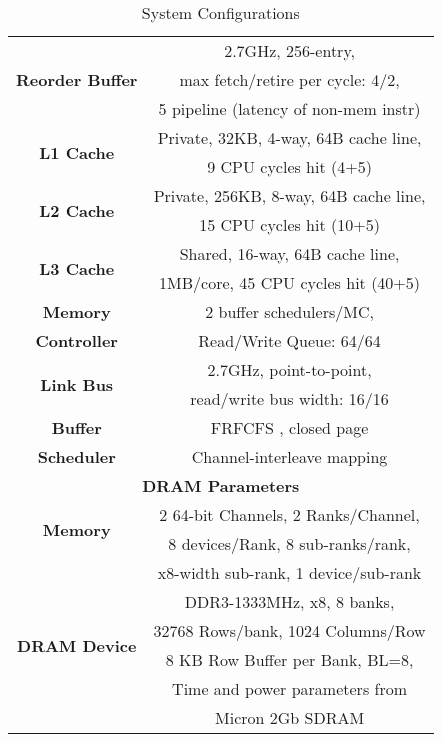 \documentclass[pageno]{jpaper}
\begin{document}
\begin{table}[h!]
  \centering
  \begin{tabular}{|c|c|}
    \hline
    \multirow{3}{*}{\textbf{Reorder Buffer}} & 2.7GHz, 256-entry, \\ & max fetch/retire per cycle: 4/2, \\ & 5 pipeline (latency of non-mem instr) \\
    \hline
    \multirow{2}{*}{\textbf{L1 Cache}} & Private, 32KB, 4-way, 64B cache line, \\ & 9 CPU cycles hit (4+5) \\
    \hline
    \multirow{2}{*}{\textbf{L2 Cache}} & Private, 256KB, 8-way, 64B cache line, \\ & 15 CPU cycles hit (10+5) \\
    \hline
    \multirow{2}{*}{\textbf{L3 Cache}} & Shared, 16-way, 64B cache line, \\ & 1MB/core, 45 CPU cycles hit (40+5) \\
    \hline
    \textbf{Memory} & 2 buffer schedulers/MC, \\
    \textbf{Controller} & Read/Write Queue: 64/64 \\
\hline
    \multirow{2}{*}{\textbf{Link Bus}} & 2.7GHz, point-to-point, \\ & read/write bus width: 16/16 \\
    \hline
    \textbf{Buffer} & FRFCFS \cite{FRFCFSScheduling}, closed page \\
    \textbf{Scheduler}  & Channel-interleave mapping \\
    \hline
    \multicolumn{2}{|c|}{\textbf{DRAM Parameters}} \\
    \hline
    \multirow{2}{*}{\textbf{Memory}} & 2 64-bit Channels, 2 Ranks/Channel, \\ & 8 devices/Rank, 8 sub-ranks/rank, \\ & x8-width sub-rank, 1 device/sub-rank \\
    \hline
    \multirow{4}{*}{\textbf{DRAM Device}} & DDR3-1333MHz, x8, 8 banks, \\ & 32768 Rows/bank, 1024 Columns/Row \\ & 8 KB Row Buffer per Bank, BL=8, \\ & Time and power parameters from \\ & Micron 2Gb SDRAM \cite{DDR3SDRAM} \\
    \hline
  \end{tabular}
  \caption{System Configurations}
  \label{SystemConfiguration}
\end{table}
\end{document}

